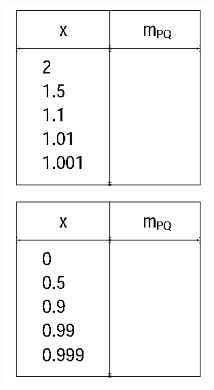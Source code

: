 \documentclass[10pt]{book}
\theoremstyle{definition}
\begin{document}
\begin{figure}[h!]
    \includegraphics[scale=0.35]{fig2.png}
\end{figure}
\clearpage
\end{document}
